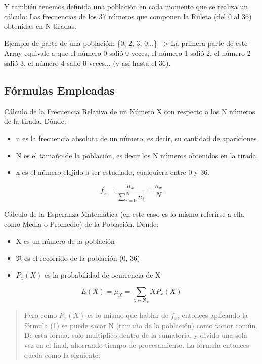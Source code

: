 \documentclass[a4paper]{article}
\begin{document}
Y también tenemos definida una población en cada momento que se realiza un cálculo: Las frecuencias de los 37 números que componen la Ruleta (del 0 al 36) obtenidas en N tiradas.

Ejemplo de parte de una población: \{0, 2, 3, 0...\} --> La primera parte de este Array equivale a que el número 0 salió 0 veces, el número 1 salió 2, el número 2 salió 3, el número 4 salió 0 veces... (y así hasta el 36).

\subsection{Fórmulas Empleadas}
\label{sec:formulas}

Cálculo de la Frecuencia Relativa de un Número X con respecto a los N números de la tirada. Dónde:
\begin{itemize}
    \item n es la frecuencia absoluta de un número, es decir, su cantidad de apariciones
    \item N es el tamaño de la población, es decir los N números obtenidos en la tirada.
    \item x es el número elejido a ser estudiado, cualquiera entre 0 y 36.
\end{itemize}

\begin{equation}
    \textit{f}_{x} = \frac {n_{x}} {\sum_{i=0}^{N}n_{i}}
    = \frac {n_{x}} {N}
\end{equation}

Cálculo de la Esperanza Matemática (en este caso es lo mísmo referirse a ella como Media o Promedio) de la Población. Dónde:
\begin{itemize}
    \item X es un número de la población
    \item \(\Re\) es el recorrido de la población (0, 36)
    \item \(P_{x}(X)\) es la probabilidad de ocurrencia de X
\end{itemize}
\begin{equation}
    \textit{E}(X) = \mu_{X} = \sum_{x \in \Re_{x}}X P_{x}(X)
\end{equation}

\begin{quote}
    Pero como  \(P_{x}(X)\) es lo mismo que hablar de \({f}_{x}\), entonces aplicando la fórmula (1) se puede sacar N (tamaño de la población) como factor común. De esta forma, solo multiplico dentro de la sumatoria, y divido una sola vez en el final, ahorrando tiempo de procesamiento. La fórmula entonces queda como la siguiente:
\end{quote}
\end{document}

